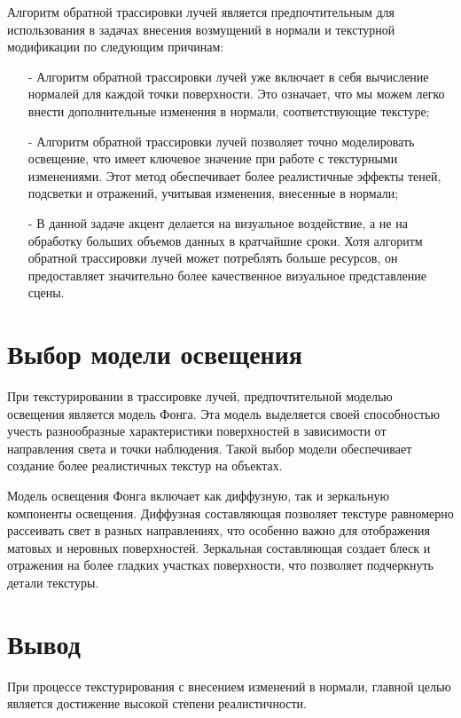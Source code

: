 Алгоритм обратной трассировки лучей является предпочтительным для использования в задачах внесения возмущений в нормали и текстурной модификации по следующим причинам:
\begin{itemize}[label=\arabic*)]
	\item[-] Алгоритм обратной трассировки лучей уже включает в себя вычисление нормалей для каждой точки поверхности. Это означает, что мы можем легко внести дополнительные изменения в нормали, соответствующие текстуре;
	\item[-] Алгоритм обратной трассировки лучей позволяет точно моделировать освещение, что имеет ключевое значение при работе с текстурными изменениями. Этот метод обеспечивает более реалистичные эффекты теней, подсветки и отражений, учитывая изменения, внесенные в нормали;
	\item[-] В данной задаче акцент делается на визуальное воздействие, а не на обработку больших объемов данных в кратчайшие сроки. Хотя алгоритм обратной трассировки лучей может потреблять больше ресурсов, он предоставляет значительно более качественное визуальное представление сцены.
\end{itemize}

\section{Выбор модели освещения}

При текстурировании в трассировке лучей, предпочтительной моделью
освещения является модель Фонга. Эта модель выделяется своей способностью учесть разнообразные характеристики поверхностей в зависимости от направления света и точки наблюдения. Такой выбор модели обеспечивает создание более реалистичных текстур на объектах.

Модель освещения Фонга включает как диффузную, так и зеркальную компоненты освещения. Диффузная составляющая позволяет текстуре равномерно рассеивать свет в разных направлениях, что особенно важно для отображения матовых и неровных поверхностей. Зеркальная составляющая создает блеск и отражения на более гладких участках поверхности, что позволяет подчеркнуть детали текстуры.

\section*{Вывод}

При процессе текстурирования с внесением изменений в нормали, главной целью является достижение высокой степени реалистичности.

